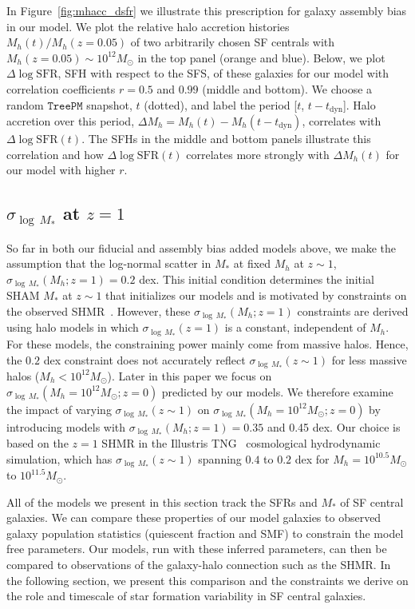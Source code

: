 \documentclass[12pt, letterpaper, preprint, tighten]{aastex62}
\newcommand{\edt}[1]{{\color{dred}{\bf} #1}}
\newcommand{\logsfr}{\log\mathrm{SFR}}
\begin{document}
In Figure~\ref{fig:mhacc_dsfr} we illustrate this prescription for galaxy
assembly bias in our model. We plot the relative halo accretion histories
$M_h(t)/M_h(z{=}0.05)$ of two arbitrarily chosen SF centrals with
$M_h(z{=}0.05)\sim10^{12}M_\odot$ in the top panel (orange and blue). Below, we plot
$\Delta\logsfr$, SFH with respect to the SFS, of these galaxies for our model with
correlation coefficients $r=0.5$ and $0.99$ (middle and bottom). We choose a
random $\mathtt{TreePM}$ snapshot, $t$ (dotted), and label the period
[$t$, $t - t_\mathrm{dyn}$]. Halo accretion over this period,
$\Delta M_h = M_h(t) - M_h(t-t_\mathrm{dyn})$, correlates with $\Delta\logsfr(t)$.
The SFHs in the middle and bottom panels illustrate this correlation and how
$\Delta\logsfr(t)$ correlates more strongly with $\Delta M_h(t)$ for our model
with higher $r$.

\subsection{\edt{$\sigma_{\log\,M_*}$ at $z=1$}}
\edt{So far in both our fiducial and assembly bias added models above, we make the
assumption that the log-normal scatter in $M_*$ at fixed $M_h$ at $z\sim1$,
$\sigma_{\log\,M_*}(M_h; z=1) = 0.2$ dex. This initial condition determines
the initial SHAM $M_*$ at $z\sim1$ that initializes our models and is motivated
by constraints on the observed
SHMR~\citep[\emph{e.g.}][]{leauthaud2012, tinker2013, patel2015}. However,
these $\sigma_{\log\,M_*}(M_h; z=1)$ constraints are derived using halo models
in which $\sigma_{\log\,M_*}(z = 1)$ is a constant, independent of $M_h$.
For these models, the constraining power mainly come from massive halos.
Hence, the $0.2$ dex constraint does not accurately reflect $\sigma_{\log\,M_*}(z\sim1)$
for less massive halos ($M_h < 10^{12}M_\odot$).
Later in this paper we focus on $\sigma_{\log\,M_*}(M_h=10^{12}M_\odot; z=0)$
predicted by our models. We therefore examine the impact of varying
$\sigma_{\log\,M_*}(z\sim1)$ on $\sigma_{\log\,M_*}(M_h=10^{12}M_\odot; z=0)$
by introducing models with $\sigma_{\log\,M_*}(M_h; z=1) = 0.35$ and 0.45 dex.
Our choice is based on the $z=1$ SHMR in the Illustris TNG~\citep{pillepich2018}
cosmological hydrodynamic simulation, which has $\sigma_{\log\,M_*}(z\sim1)$
spanning $0.4$ to $0.2$ dex for $M_h = 10^{10.5}M_\odot$ to $10^{11.5}M_\odot$.}

\edt{All of the models we present in this section track the SFRs and $M_*$ of SF
central galaxies. We can compare these properties of our model galaxies
to observed galaxy population statistics (quiescent fraction and SMF) to
constrain the model free parameters.}
Our models, run with these inferred
parameters, can then be compared to observations of the galaxy-halo connection
such as the SHMR. In the following section, we present this comparison and
the constraints we derive on the role and timescale of star formation
variability in SF central galaxies.
\end{document}
